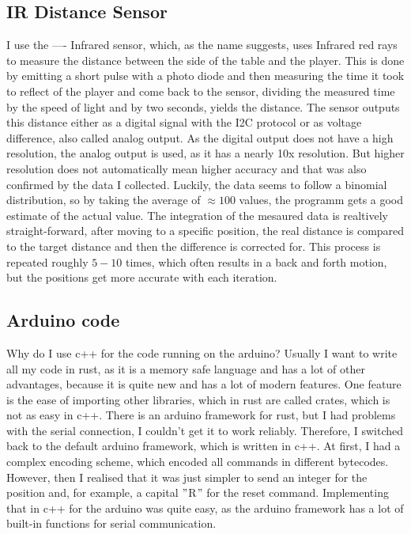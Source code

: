 \subsection{IR Distance Sensor}\label{subsec:ir-distance-sensor}
I use the ---- Infrared sensor, which, as the name suggests, uses Infrared red rays to measure the distance between the side of the table and the player.
This is done by emitting a short pulse with a photo diode and then measuring the time it took to reflect of the player and come back to the sensor, dividing the measured time by the speed of light and by two seconds, yields the distance.
The sensor outputs this distance either as a digital signal with the I2C protocol or as voltage difference, also called analog output.
As the digital output does not have a high resolution, the analog output is used, as it has a nearly 10x resolution.
But higher resolution does not automatically mean higher accuracy and that was also confirmed by the data I collected.
Luckily, the data seems to follow a binomial distribution, so by taking the average of $\approx100$ values, the programm gets a good estimate of the actual value.
The integration of the mesaured data is realtively straight-forward, after moving to a specific position, the real distance is compared to the target distance and then the difference is corrected for.
This process is repeated roughly $5-10$ times, which often results in a back and forth motion, but the positions get more accurate with each iteration.

\subsection{Arduino code}\label{subsec:arduino-code}
Why do I use c++ for the code running on the arduino?
Usually I want to write all my code in rust, as it is a memory safe language and has a lot of other advantages, because it is quite new and has a lot of modern features.
One feature is the ease of importing other libraries, which in rust are called crates, which is not as easy in c++.
There is an arduino framework for rust, but I had problems with the serial connection, I couldn't get it to work reliably.
Therefore, I switched back to the default arduino framework, which is written in c++.
At first, I had a complex encoding scheme, which encoded all commands in different bytecodes.
However, then I realised that it was just simpler to send an integer for the position and, for example, a capital \("\)R\("\) for the reset command.
Implementing that in c++ for the arduino was quite easy, as the arduino framework has a lot of built-in functions for serial communication.